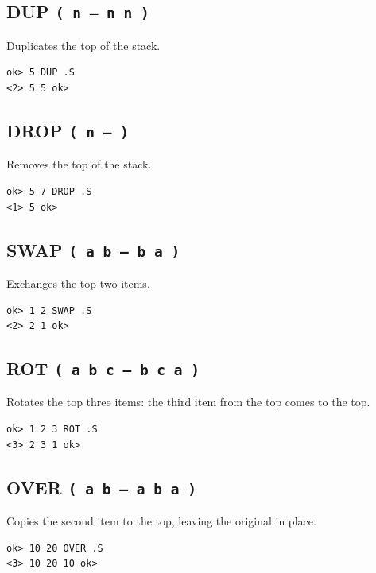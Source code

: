 \subsection*{DUP \texttt{( n -- n n )}}

Duplicates the top of the stack.

\begin{lstlisting}[language=Forth]
ok> 5 DUP .S
<2> 5 5 ok>
\end{lstlisting}

\subsection*{DROP \texttt{( n -- )}}

Removes the top of the stack.

\begin{lstlisting}[language=Forth]
ok> 5 7 DROP .S
<1> 5 ok>
\end{lstlisting}

\subsection*{SWAP \texttt{( a b -- b a )}}

Exchanges the top two items.

\begin{lstlisting}[language=Forth]
ok> 1 2 SWAP .S
<2> 2 1 ok>
\end{lstlisting}

\subsection*{ROT \texttt{( a b c -- b c a )}}

Rotates the top three items: the third item from the top comes to the top.

\begin{lstlisting}[language=Forth]
ok> 1 2 3 ROT .S
<3> 2 3 1 ok>
\end{lstlisting}

\subsection*{OVER \texttt{( a b -- a b a )}}

Copies the second item to the top, leaving the original in place.

\begin{lstlisting}[language=Forth]
ok> 10 20 OVER .S
<3> 10 20 10 ok>
\end{lstlisting}

